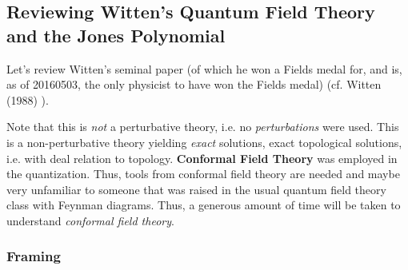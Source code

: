 \documentclass[10pt]{amsart}
\begin{document}
\begin{multicols}{2}

    







\subsection{Reviewing Witten's Quantum Field Theory and the Jones Polynomial}

Let's review Witten's seminal paper (of which he won a Fields medal for, and is, as of 20160503, the only physicist to have won the Fields medal) (cf. Witten (1988) \cite{Witten:1988hf}).  

Note that this is \emph{not} a perturbative theory, i.e. no \emph{perturbations} were used.  This is a non-perturbative theory yielding \emph{exact} solutions, exact topological solutions, i.e. with deal relation to topology.  \textbf{Conformal Field Theory} was employed in the quantization.  Thus, tools from conformal field theory are needed and maybe very unfamiliar to someone that was raised in the usual quantum field theory class with Feynman diagrams.  Thus, a generous amount of time will be taken to understand \emph{conformal field theory}.  


\subsubsection{Framing}










\end{multicols}
\end{document}
